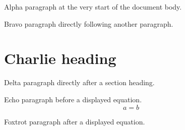 \documentclass[a4paper,10pt]{article}
\begin{document}
Alpha paragraph at the very start of the document body.

Bravo paragraph directly following another paragraph.

\section{Charlie heading}

Delta paragraph directly after a section heading.

Echo paragraph before a displayed equation.
\[ a = b \]

Foxtrot paragraph after a displayed equation.
\end{document}
